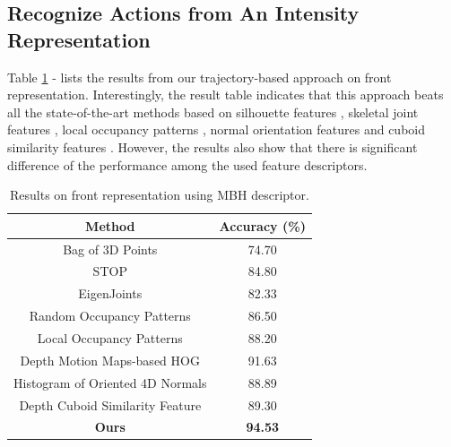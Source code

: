 \documentclass[review]{elsarticle}
\begin{document}
\subsection{Recognize Actions from An Intensity Representation}

Table \ref{lbl:MBHvsSoAonFront} - lists the results from our trajectory-based approach on front representation. Interestingly, the result table indicates that this approach beats all the state-of-the-art methods based on silhouette features \cite{li2010action, yang2012recognizing}, skeletal joint features \cite{yang2012eigenjoints, wang2012mining}, local occupancy patterns \cite{wang2012robust, vieira2012stop}, normal orientation features \cite{oreifej2013hon4d} and cuboid similarity features \cite{xia2013spatio}. However, the results also show that there is significant difference of the performance among the used feature descriptors.

\begin{table}[H]
	\begin{center}
		\begin{tabular}{c|c}
		
		  {\bf Method} & {\bf Accuracy (\%)} \\
		\hline
		Bag of 3D Points \cite{li2010action} &         74.70  \\
		
		      STOP \cite{vieira2012stop} &         84.80  \\
		
		EigenJoints \cite{yang2012eigenjoints} &         82.33  \\
		
		Random Occupancy Patterns \cite{wang2012robust} &         86.50  \\
		
		Local Occupancy Patterns \cite{wang2012mining} &         88.20  \\
		
		Depth Motion Maps-based HOG \cite{yang2012recognizing} &         91.63  \\
		
		Histogram of Oriented 4D Normals \cite{oreifej2013hon4d} &         88.89  \\
		
		Depth Cuboid Similarity Feature \cite{xia2013spatio} &         89.30  \\
		\hline
		    {\bf Ours} &   {\bf 94.53 } \\
		
		\end{tabular}  
	\end{center}
	\caption{\label{lbl:MBHvsSoAonFront}Results on front representation using MBH descriptor.}
\end{table}
\end{document}
